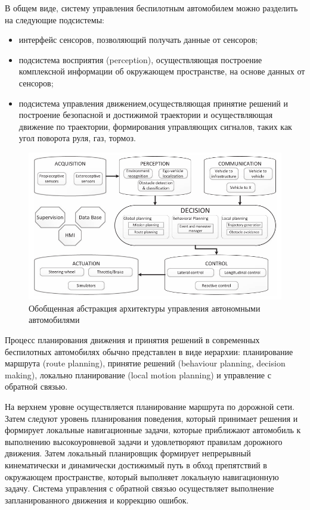 В общем виде, систему управления беспилотным автомобилем
можно разделить на следующие подсистемы:
\begin{itemize}
    \item интерфейс сенсоров, позволяющий получать данные от сенсоров;
    \item подсистема восприятия (perception), осуществляющая построение комплексной информации об
    окружающем пространстве, на основе данных от сенсоров;
    \item подсистема управления движением,осуществляющая принятие решений и построение безопасной
    и достижимой траектории и осуществляющая движение по траектории, формирования управляющих сигналов,
    таких как угол поворота руля, газ, тормоз.
\end{itemize}

\begin{figure}[h]
    \centering
    \includegraphics[width=\linewidth]{images/general_arch}
    \caption{Обобщенная абстракция архитектуры управления автономными автомобилями}
    \label{img:general_arch}
\end{figure}

Процесс планирования движения и принятия решений в современных беспилотных автомобилях обычно представлен в виде
иерархии: планирование маршрута (route planning), принятие решений (behaviour planning, decision making), локально планирование
(local motion planning) и управление с обратной связью.

На верхнем уровне осуществляется планирование маршрута по дорожной сети. Затем следуют уровень планирования
поведения, который принимает решения и формирует локальные навигационные задачи, которые приближают автомобиль
к выполнению высокоуровневой задачи и удовлетворяют правилам дорожного движения. Затем локальный планировщик
формирует непрерывный кинематически и динамически достижимый путь в обход препятствий в окружающем пространстве, который выполняет локальную навигационную задачу. Система
управления с обратной связью осуществляет выполнение запланированного движения и коррекцию ошибок.

